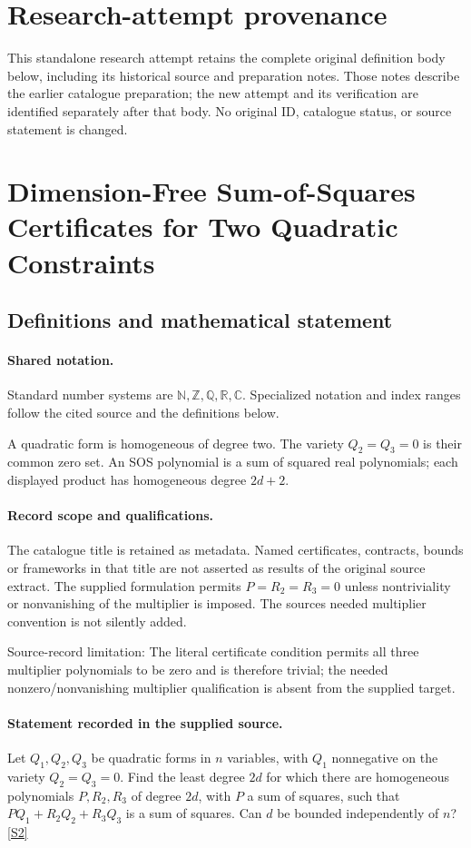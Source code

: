 \documentclass[11pt]{article}
\begin{document}
\section*{Research-attempt provenance}
This standalone research attempt retains the complete original definition body below,
including its historical source and preparation notes. Those notes describe the
earlier catalogue preparation; the new attempt and its verification are identified
separately after that body. No original ID, catalogue status, or source statement is changed.

\section{Dimension-Free Sum-of-Squares Certificates for Two Quadratic Constraints}\label{statement}

\subsection{Definitions and mathematical statement}

\paragraph{Shared notation.}Standard number systems are $\mathbb N,\mathbb Z,\mathbb Q,\mathbb R,\mathbb C$. Specialized notation and index ranges follow the cited source and the definitions below.


A quadratic form is homogeneous of degree two. The variety $Q_2=Q_3=0$ is their common zero set. An SOS polynomial is a sum of squared real polynomials; each displayed product has homogeneous degree $2d+2$.
\paragraph{Record scope and qualifications.}
The catalogue title is retained as metadata. Named certificates, contracts, bounds or frameworks in that title are not asserted as results of the original source extract.
The supplied formulation permits $P=R_2=R_3=0$ unless nontriviality or nonvanishing of the multiplier is imposed. The source\textquotesingle s needed multiplier convention is not silently added.

Source-record limitation: The literal certificate condition permits all three multiplier polynomials to be zero and is therefore trivial; the needed nonzero/nonvanishing multiplier qualification is absent from the supplied target.
\paragraph{Statement recorded in the supplied source.}
Let $Q_1,Q_2,Q_3$ be quadratic forms in $n$ variables, with $Q_1$ nonnegative on the variety $Q_2=Q_3=0$. Find the least degree $2d$ for which there are homogeneous polynomials $P,R_2,R_3$ of degree $2d$, with $P$ a sum of squares, such that $PQ_1+R_2Q_2+R_3Q_3$ is a sum of squares. Can $d$ be bounded independently of $n$? \href{https://doi.org/10.4171/owr/2025/9}{[S2]}
\end{document}
